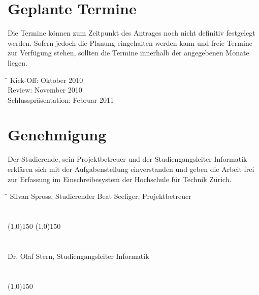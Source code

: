 \documentclass[]{scrreprt}
\begin{document}
    \section{Geplante Termine}
    Die Termine können zum Zeitpunkt des Antrages noch nicht definitiv 
    festgelegt werden. Sofern jedoch die Planung eingehalten werden kann und 
    freie Termine zur Verfügung stehen, sollten die Termine innerhalb der 
    angegebenen Monate liegen.

    \begin{tabbing}
        \hspace*{4cm}\= \kill
    	Kick-Off:               \> Oktober 2010 \\
    	Review:                 \> November 2010 \\
    	Schlusspräsentation:    \> Februar 2011 \\
    \end{tabbing}

    \section{Genehmigung}
    Der Studierende, sein Projektbetreuer und der Studiengangsleiter 
    Informatik erklären sich mit der Aufgabenstellung einverstanden und geben 
    die Arbeit frei zur Erfassung im Einschreibesystem der Hochschule für 
    Technik Zürich.

    \begin{tabbing}
        \hspace*{10cm}\= \kill
    	Silvan Spross, Studierender \> Beat Seeliger, Projektbetreuer \\\\\\
        \line(1,0){150} \> \line(1,0){150} \\\\\\
    	Dr. Olaf Stern, Studiengangsleiter Informatik \\\\\\
        \line(1,0){150}
    \end{tabbing}
    
    \renewcommand{\bibname}{Referenzen}
    
    
    
\end{document}
